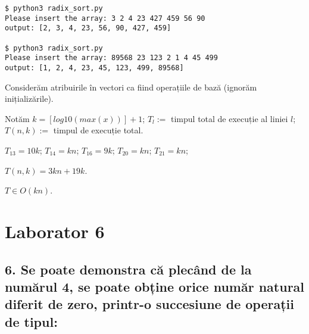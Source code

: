 \documentclass[11pt]{article}
\begin{document}
\begin{verbatim}
$ python3 radix_sort.py
Please insert the array: 3 2 4 23 427 459 56 90
output: [2, 3, 4, 23, 56, 90, 427, 459]

$ python3 radix_sort.py
Please insert the array: 89568 23 123 2 1 4 45 499
output: [1, 2, 4, 23, 45, 123, 499, 89568]
\end{verbatim}


Considerăm atribuirile în vectori ca fiind operațiile de bază (ignorăm inițializările).

Notăm $k = [\mathit{log10}(\mathit{max}(x))] + 1$; $T_l := $ timpul total de execuție al liniei $l$; $T(n, k) :=$ timpul de execuție total.

$T_{13} = 10 k$;
$T_{14} = k n$;
$T_{16} = 9 k$;
$T_{20} = k n$;
$T_{21} = k n$;

$T(n, k) = 3kn + 19k$.

\vspace{7pt}
$T \in O(kn)$.

\section*{Laborator 6}
\label{sec:org3ec893e}
\subsection*{6. Se poate demonstra că plecând de la numărul 4, se poate obține orice număr natural diferit de zero, printr-o succesiune de operații de tipul:}
\label{sec:org5a3fc04}
\end{document}
